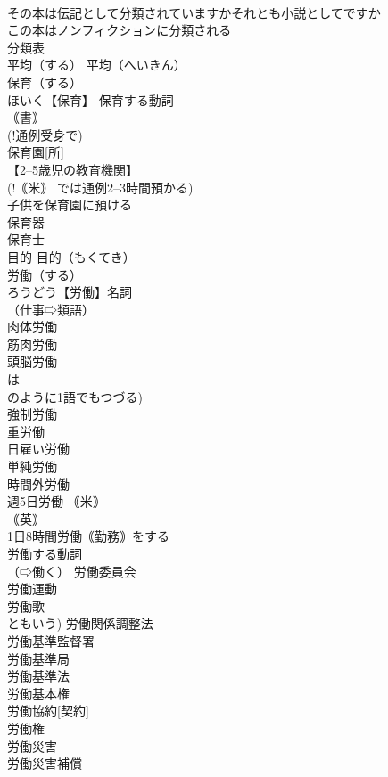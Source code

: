\documentclass[8pt]{extreport}
\begin{document}
\begin{CJK}{UTF8}{min}
\\	その本は伝記として分類されていますかそれとも小説としてですか 
\\	この本はノンフィクションに分類される 
\\	分類表 
\\	平均（する）		平均（へいきん） 
\\	保育（する）		
\\	ほいく【保育】 保育する動詞 
\\	｟書｠
\\	(!通例受身で) 
\\	保育園[所] 
\\	【2--5歳児の教育機関】
\\	(!｟米｠ では通例2--3時間預かる) 
\\	子供を保育園に預ける 
\\	保育器 
\\	保育士 
\\	目的		目的（もくてき） 
\\	労働（する）		
\\	ろうどう【労働】名詞 
\\	（仕事⇨類語） 
\\	肉体労働 
\\	筋肉労働 
\\	頭脳労働 
\\	は 
\\	のように1語でもつづる) 
\\	強制労働 
\\	重労働 
\\	日雇い労働 
\\	単純労働 
\\	時間外労働 
\\	週5日労働 ｟米｠
\\	｟英｠
\\	1日8時間労働｟勤務｠をする 
\\	労働する動詞 
\\	（⇨働く） 労働委員会 
\\	労働運動 
\\	労働歌 
\\	ともいう) 労働関係調整法 
\\	労働基準監督署 
\\	労働基準局 
\\	労働基準法 
\\	労働基本権 
\\	労働協約[契約] 
\\	労働権 
\\	労働災害 
\\	労働災害補償 

\end{CJK}
\end{document}
